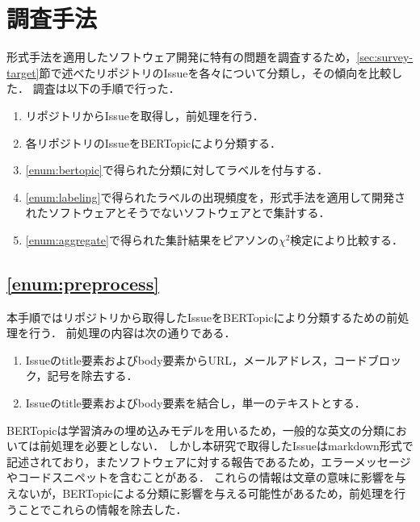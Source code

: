 \documentclass[main]{subfiles}
\begin{document}
\chapter{調査手法}

形式手法を適用したソフトウェア開発に特有の問題を調査するため，\ref{sec:survey-target}節で述べたリポジトリのIssueを各々について分類し，その傾向を比較した．
調査は以下の手順で行った．

\begin{enumerate}[label=手順\arabic*.]
	\item \label{enum:preprocess}
	      リポジトリからIssueを取得し，前処理を行う．
	\item \label{enum:bertopic}
	      各リポジトリのIssueをBERTopicにより分類する．
	\item \label{enum:labeling}
	      \ref{enum:bertopic}で得られた分類に対してラベルを付与する．
	\item \label{enum:aggregate}
	      \ref{enum:labeling}で得られたラベルの出現頻度を，形式手法を適用して開発されたソフトウェアとそうでないソフトウェアとで集計する．
	\item \label{enum:statistical}
	      \ref{enum:aggregate}で得られた集計結果をピアソンの\(\chi^2\)検定により比較する．
\end{enumerate}

\section{\ref{enum:preprocess}}

本手順ではリポジトリから取得したIssueをBERTopicにより分類するための前処理を行う．
前処理の内容は次の通りである．

\begin{enumerate}
	\item \label{enum:filter}
	      Issueのtitle要素およびbody要素からURL，メールアドレス，コードブロック，記号を除去する．
	\item \label{enum:lowercase}
	      Issueのtitle要素およびbody要素を結合し，単一のテキストとする．
\end{enumerate}

BERTopicは学習済みの埋め込みモデルを用いるため，一般的な英文の分類においては前処理を必要としない．
しかし本研究で取得したIssueはmarkdown形式で記述されており，またソフトウェアに対する報告であるため，エラーメッセージやコードスニペットを含むことがある．
これらの情報は文章の意味に影響を与えないが，BERTopicによる分類に影響を与える可能性があるため，前処理を行うことでこれらの情報を除去した．
\end{document}
